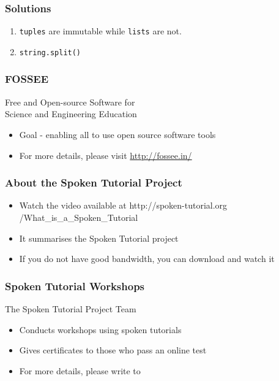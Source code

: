 \documentclass[17pt,compress]{beamer}
\begin{document}
\begin{frame}
\frametitle{Solutions}
\label{sec-15}


\begin{enumerate}
\item \texttt{tuples} are immutable while \texttt{lists} are not.\pause
\vspace{12pt}
\item \texttt{string.split()}
\end{enumerate}
\end{frame}
\begin{frame}
\frametitle{FOSSEE}
{\color{blue}Free and Open-source Software for \\Science and Engineering Education} \\
\begin{itemize}
\item Goal - enabling all to use open source software tools
\item For more details, please visit {\color{blue}\url{http://fossee.in/}}
\end{itemize}
\end{frame}
\begin{frame}
\frametitle{About the Spoken Tutorial Project}
\begin{itemize}
\item Watch the video available at {\color{blue}http://spoken-tutorial.org /What\_is\_a\_Spoken\_Tutorial}
\item It summarises the Spoken Tutorial project \pause
\item If you do not have good bandwidth, you can download and watch it
\end{itemize}
\end{frame}
\begin{frame}
\frametitle{Spoken Tutorial Workshops}The Spoken Tutorial Project Team 
\begin{itemize}
\item Conducts workshops using spoken tutorials 
\item Gives certificates to those who pass an online test 
\item For more details, please write to \\ 
\end{itemize}
\end{frame}
\end{document}

